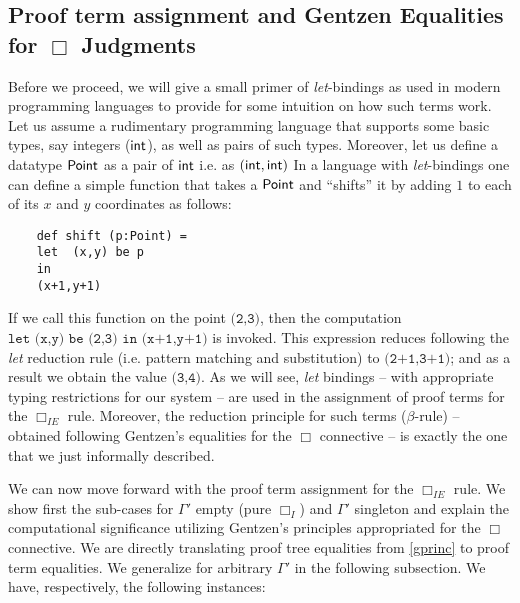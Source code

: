     \subsection{Proof term assignment and Gentzen Equalities for $\Box$ Judgments}
    Before we proceed, we will give a small primer of \textit{let}-bindings as used in modern programming languages to provide for some intuition on how such terms work. 
    Let us assume a rudimentary programming language that supports some basic types, say integers (${\sf int}$), as well as pairs of such types. Moreover, let us define a datatype 
    $\sf{Point}$ as a pair of ${\sf int}$ i.e. as $\sf {(int,int)}$ 
    In  a language with \textit{let}-bindings one can define a simple function that takes a ${\sf Point}$ and ``shifts'' it by adding $1$ to each of its $x$ and $y$ coordinates as follows:
    \begin{lstlisting}
    def shift (p:Point) = 
    let  (x,y) be p
    in
    (x+1,y+1)
    \end{lstlisting}
    If we call this function on the point ${\texttt{(2,3)}}$, then the computation ${\texttt{let (x,y) be (2,3) in (x+1,y+1)}}$ is invoked. This expression reduces following the \textit{let} reduction rule
    (i.e. pattern matching and substitution) to $\texttt{(2+1,3+1)}$; and as a result we obtain the value $\texttt{(3,4)}$.  As we will see, {\textit{let}} bindings -- with appropriate typing restrictions for our system -- 
    are used in the assignment of proof terms for the $\Box_{IE}$ rule. Moreover, the reduction principle for such terms ($\beta$-rule) -- obtained following Gentzen's equalities for the $\Box$ connective --  
    is exactly the one that we just informally described. 
    
    We can now move forward with the  proof term assignment 
    for the $\Box_{IE}$ rule.  We show first the sub-cases for 
    $\Gamma'$ empty (pure $\Box_I$)  and $\Gamma'$ 
    singleton and explain the computational significance 
    utilizing Gentzen's principles appropriated for the $\Box$ 
    connective. We are  directly translating proof tree equalities 
    from \ref{gprinc} to proof term equalities. 
    We generalize for arbitrary $\Gamma'$ in the following subsection. 
    We have, respectively, the following instances:
    
    
